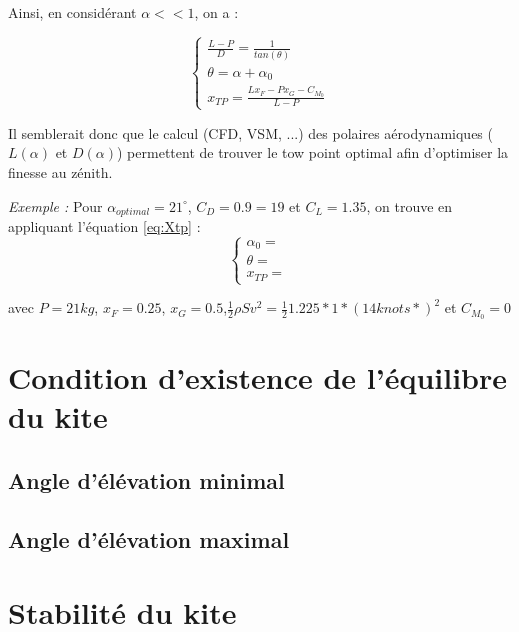 \documentclass[conference]{IEEEtran}
\begin{document}
Ainsi, en considérant $\alpha << 1$, on a :

\begin{equation}
    \begin{cases}
    \frac{L-P}{D} = \frac{1}{tan(\theta)} \\
    \theta = \alpha + \alpha_0 \\
    x_{TP} = \frac{L x_F - P x_G -C_{M_0}}{L - P}
    \end{cases}
    \label{eq:Xtp}
\end{equation}
    
Il semblerait donc que le calcul (CFD, VSM, ...) des polaires aérodynamiques ($L(\alpha)$ et $D(\alpha)$) permettent de trouver le tow point optimal afin d'optimiser la finesse au zénith. 

\textit{Exemple : }
Pour $\alpha_{optimal} = 21^\circ$, $C_D = 0.9=19$ et $C_L = 1.35$, on trouve en appliquant l'équation \ref{eq:Xtp} : \\

\begin{equation}
    \begin{cases}
    \alpha_0 = \\
    \theta = \\
    x_{TP} = 
    \end{cases}
    \label{eq:Xtp}
\end{equation}

avec $P = 21 kg$, $x_F = 0.25$, $x_G = 0.5$,$\frac{1}{2} \rho S v^2 = \frac{1}{2} 1.225 * 1 * (14 knots * )^2$  et $C_{M_0} = 0$

\IEEEpeerreviewmaketitle
\section{Condition d'existence de l'équilibre du kite }

\subsection{Angle d'élévation minimal} 


\subsection{Angle d'élévation maximal}

\section{Stabilité du kite }
\end{document}
